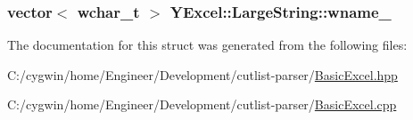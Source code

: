 \subsubsection[{wname\+\_\+}]{\setlength{\rightskip}{0pt plus 5cm}vector$<$ wchar\+\_\+t $>$ Y\+Excel\+::\+Large\+String\+::wname\+\_\+}\label{struct_y_excel_1_1_large_string_a1cdf115960a6d9f631357ff4c8e8cf29}


The documentation for this struct was generated from the following files\+:\begin{DoxyCompactItemize}
\item 
C\+:/cygwin/home/\+Engineer/\+Development/cutlist-\/parser/\hyperlink{_basic_excel_8hpp}{Basic\+Excel.\+hpp}\item 
C\+:/cygwin/home/\+Engineer/\+Development/cutlist-\/parser/\hyperlink{_basic_excel_8cpp}{Basic\+Excel.\+cpp}\end{DoxyCompactItemize}
